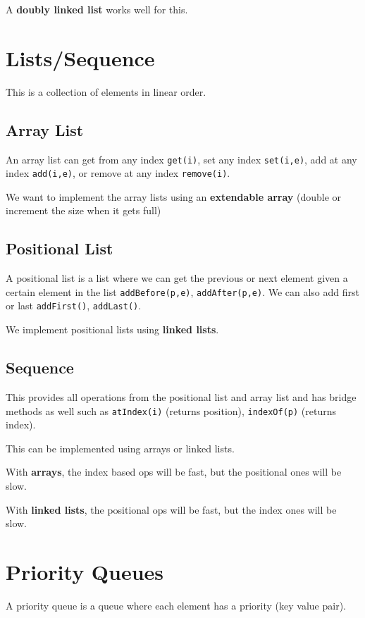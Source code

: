 \documentclass[12pt,letterpaper]{article} \usepackage{amsmath} \usepackage{graphicx} \usepackage[margin=1in]{geometry} \usepackage{longtable}  \usepackage{amssymb}
\begin{document}
	A\textbf{ doubly linked list} works well for this. 
	
	\section{Lists/Sequence}
	This is a collection of elements in linear order. 
	
	\subsection{Array List}
	An array list can get from any index \verb|get(i)|, set any index \verb|set(i,e)|, add at any index \verb|add(i,e)|, or remove at any index \verb|remove(i)|.
	
	We want to implement the array lists using an\textbf{ extendable array} (double or increment the size when it gets full)
	
	\subsection{Positional List}
	
	A positional list is a list where we can get the previous or next element given a certain element in the list \verb|addBefore(p,e)|, \verb|addAfter(p,e)|. We can also add first or last \verb|addFirst()|, \verb|addLast()|.
	
	We implement positional lists using \textbf{linked lists}. 
	
	\subsection{Sequence}
	
	This provides all operations from the positional list and array list and has bridge methods as well such as \verb|atIndex(i)| (returns position), \verb|indexOf(p)| (returns index).
	
	This can be implemented using arrays or linked lists. 
	
	With \textbf{arrays}, the index based ops will be fast, but the positional ones will be slow. 
	
	With \textbf{linked lists}, the positional ops will be fast, but the index ones will be slow. 
	
	\section{Priority Queues}
	A priority queue is a queue where each element has a priority (key value pair). 
	
\end{document}

